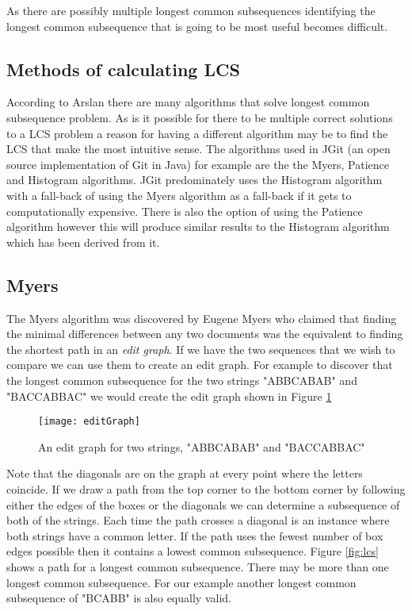 As there are possibly multiple longest common subsequences identifying the longest common subsequence that is going to be most useful becomes difficult.

\subsection{Methods of calculating LCS}
According to Arslan \cite{Arslan2010} there are many algorithms that solve longest common subsequence problem. As is it possible for there to be multiple correct solutions to a LCS problem a reason for having a different algorithm may be to find the LCS that make the most intuitive sense. The algorithms used in JGit (an open source implementation of Git in Java) for example are the the Myers, Patience and Histogram algorithms. JGit predominately uses the Histogram algorithm with a fall-back of using the Myers algorithm as a fall-back if it gets to computationally expensive.  There is also the option of using the Patience algorithm however this will produce similar results to the Histogram algorithm which has been derived from it. 

\subsection{Myers}
The Myers algorithm was discovered by Eugene Myers \cite{Myers1986} who claimed that finding the minimal differences between any two documents was the equivalent to finding the shortest path in an \emph{edit graph}.  
If we have the two sequences that we wish to compare we can use them to create an edit graph. 
For example to discover that the longest common subsequence for the two strings "ABBCABAB" and "BACCABBAC" we would create the edit graph shown in Figure \ref{fig:editGraph}

\begin{figure}[!t]
 \begin{center}
 \texttt{[image: editGraph]}
 \end{center}
 \caption{An edit graph for two strings, "ABBCABAB" and "BACCABBAC"}
 \label{fig:editGraph}
\end{figure} 

Note that the diagonals are on the graph at every point where the letters coincide.
If we draw a path from the top corner to the bottom corner by following either the edges of the boxes or the diagonals we can determine a subsequence of both of the strings.
Each time the path crosses a diagonal is an instance where both strings have a common letter.
If the path uses the fewest number of box edges possible then it contains a lowest common subsequence.
Figure \ref{fig:lcs} shows a path for a longest common subsequence.
There may be more than one longest common subsequence.
For our example another longest common subsequence of "BCABB" is also equally valid.



